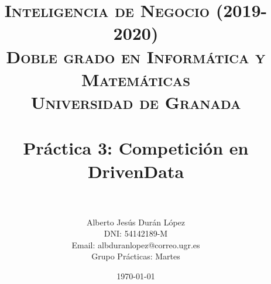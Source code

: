 \usepackage{listings}
\usepackage{color}
\usepackage{tabularx}
\usepackage{graphicx}
\usepackage{array}
\usepackage{hyperref}
\usepackage{url} %


\title{	
	\normalfont \normalsize 
	\textsc{\textbf{Inteligencia de Negocio (2019-2020)} \\ Doble grado en Informática y Matemáticas \\ Universidad de Granada} \\ [25pt] 
	\horrule{0.5pt} \\[0.4cm]
	\huge Práctica 3: Competición en DrivenData \\ 
	\horrule{2pt} \\[0.5cm] 
}

\author{Alberto Jesús Durán López \\
		DNI: 54142189-M \\
		Email: albduranlopez@correo.ugr.es \\
		Grupo Prácticas: Martes} 
\date{\normalsize\today}



